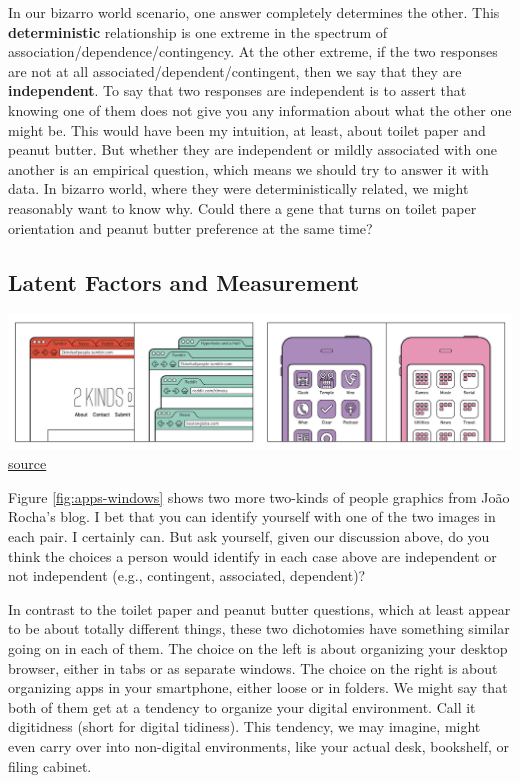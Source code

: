 \documentclass[]{book}
\begin{document}
In our bizarro world scenario, one answer completely determines the other. This \textbf{deterministic} relationship is one extreme in the spectrum of association/dependence/contingency. At the other extreme, if the two responses are not at all associated/dependent/contingent, then we say that they are \textbf{independent}. To say that two responses are independent is to assert that knowing one of them does not give you any information about what the other one might be. This would have been my intuition, at least, about toilet paper and peanut butter. But whether they are independent or mildly associated with one another is an empirical question, which means we should try to answer it with data. In bizarro world, where they were deterministically related, we might reasonably want to know why. Could there a gene that turns on toilet paper orientation and peanut butter preference at the same time?

\hypertarget{sec:factors}{%
\subsection{Latent Factors and Measurement}\label{sec:factors}}

\includegraphics{images/two-two-kinds.jpg}
\href{https://2kindsofpeople.tumblr.com/}{source}

Figure \ref{fig:apps-windows} shows two more two-kinds of people graphics from João Rocha's blog. I bet that you can identify yourself with one of the two images in each pair. I certainly can. But ask yourself, given our discussion above, do you think the choices a person would identify in each case above are independent or not independent (e.g., contingent, associated, dependent)?

In contrast to the toilet paper and peanut butter questions, which at least appear to be about totally different things, these two dichotomies have something similar going on in each of them. The choice on the left is about organizing your desktop browser, either in tabs or as separate windows. The choice on the right is about organizing apps in your smartphone, either loose or in folders. We might say that both of them get at a tendency to organize your digital environment. Call it digitidness (short for digital tidiness). This tendency, we may imagine, might even carry over into non-digital environments, like your actual desk, bookshelf, or filing cabinet.
\end{document}
